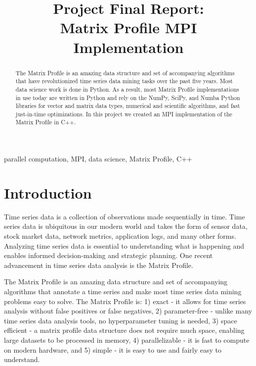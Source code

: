 \documentclass[conference]{IEEEtran}
\begin{document}
\title{Project Final Report:\\Matrix Profile MPI Implementation}

\author{
}


\maketitle
\begin{abstract}
The Matrix Profile is an amazing data structure and set of accompanying algorithms that have revolutionized time series data mining tasks over the past five years.  Most data science work is done in Python.  As a result, most Matrix Profile implementations in use today are written in Python and rely on the NumPy, SciPy, and Numba Python libraries for vector and matrix data types, numerical and scientific algorithms, and fast just-in-time optimizations.  In this project we created an MPI implementation of the Matrix Profile in C++.
\end{abstract}

\begin{IEEEkeywords}
parallel computation, MPI, data science, Matrix Profile, C++
\end{IEEEkeywords}


\section{Introduction}
Time series data is a collection of observations made sequentially in time.  Time series data is ubiquitous in our modern world and takes the form of sensor data, stock market data, network metrics, application logs, and many other forms.  Analyzing time series data is essential to understanding what is happening and enables informed decision-making and strategic planning.  One recent advancement in time series data analysis is the Matrix Profile\cite{MatrixProfile1}. 

The Matrix Profile is an amazing data structure and set of accompanying algorithms that annotate a time series and make most time series data mining problems easy to solve\cite{MatrixProfile2}. The Matrix Profile is:  1) exact - it allows for time series analysis without false positives or false negatives, 2) parameter-free - unlike many time series data analysis tools, no hyperparameter tuning is needed, 3) space efficient - a matrix profile data structure does not require much space, enabling large datasets to be processed in memory, 4) parallelizable - it is fast to compute on modern hardware, and 5) simple - it is easy to use and fairly easy to understand\cite{Keogh}.   
\end{document}
